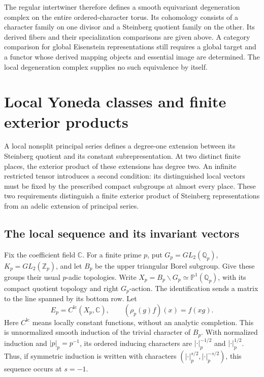 The regular intertwiner therefore defines a smooth equivariant degeneration complex on the entire ordered-character torus.
Its cohomology consists of a character family on one divisor and a Steinberg quotient family on the other.
Its derived fibers and their specialization comparisons are given above.
A category comparison for global Eisenstein representations still requires a global target and a functor
whose derived mapping objects and essential image are determined.
The local degeneration complex supplies no such equivalence by itself.


\section{Local Yoneda classes and finite exterior products}
\label{v4-arith:w10-d:X1}

A local nonsplit principal series defines a degree-one extension between
its Steinberg quotient and its constant subrepresentation. At two distinct
finite places, the exterior product of these extensions has degree two.
An infinite restricted tensor introduces a second condition: its
distinguished local vectors must be fixed by the prescribed compact
subgroups at almost every place. These two requirements distinguish a
finite exterior product of Steinberg representations from an adelic
extension of principal series.

\subsection{The local sequence and its invariant vectors}

Fix the coefficient field $\mathbb C$. For a finite prime $p$, put
$G_p=GL_2(\mathbb Q_p)$, $K_p=GL_2(\mathbb Z_p)$, and let $B_p$ be the upper triangular
Borel subgroup. Give these groups their usual $p$-adic topologies.
Write $X_p=B_p\backslash G_p\simeq\mathbb P^1(\mathbb Q_p)$, with its compact
quotient topology and right $G_p$-action. The identification sends a matrix
to the line spanned by its bottom row. Let
\[
 E_p=C^{\mathrm{lc}}(X_p,\mathbb C),\qquad
 (\rho_p(g)f)(x)=f(xg).
\]
Here $C^{\mathrm{lc}}$ means locally constant functions, without an
analytic completion. This is unnormalized smooth induction of the trivial
character of $B_p$. With normalized induction and $|p|_p=p^{-1}$, its
ordered inducing characters are $|\cdot|_p^{-1/2}$ and
$|\cdot|_p^{1/2}$. Thus, if symmetric induction is written with characters
$(|\cdot|_p^{s/2},|\cdot|_p^{-s/2})$, this sequence occurs at $s=-1$.

